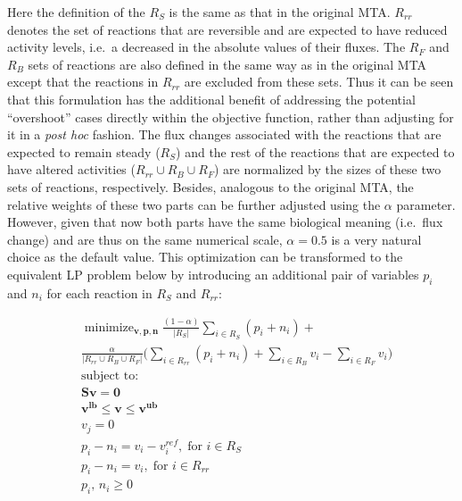 \documentclass[12pt,twoside,openany,\mydriver]{thesis}  %
\DeclareMathOperator*{\minimize}{minimize}
\begin{document}
Here the definition of the \(R_S\) is the same as that in the original MTA. \(R_{rr}\) denotes the set of reactions that are reversible and are expected to have reduced activity levels, i.e.~a decreased in the absolute values of their fluxes. The \(R_F\) and \(R_B\) sets of reactions are also defined in the same way as in the original MTA except that the reactions in \(R_{rr}\) are excluded from these sets. Thus it can be seen that this formulation has the additional benefit of addressing the potential ``overshoot'' cases directly within the objective function, rather than adjusting for it in a \emph{post hoc} fashion. The flux changes associated with the reactions that are expected to remain steady (\(R_S\)) and the rest of the reactions that are expected to have altered activities (\(R_{rr} \cup R_B \cup R_F\)) are normalized by the sizes of these two sets of reactions, respectively. Besides, analogous to the original MTA, the relative weights of these two parts can be further adjusted using the \(\alpha\) parameter. However, given that now both parts have the same biological meaning (i.e.~flux change) and are thus on the same numerical scale, \(\alpha=0.5\) is a very natural choice as the default value. This optimization can be transformed to the equivalent LP problem below by introducing an additional pair of variables \(p_i\) and \(n_i\) for each reaction in \(R_S\) and \(R_{rr}\):

\[
\begin{aligned}
&\minimize_{\mathbf{v,p,n}} \frac{(1-\alpha)}{|R_S|} \sum_{i \in R_S}{(p_i+n_i)} + \\
&\frac{\alpha}{|R_{rr} \cup R_B \cup R_F|} \bigg( \sum_{i \in R_{rr}}{(p_i+n_i)} + \sum_{i \in R_B}{v_i} - \sum_{i \in R_F}{v_i} \bigg)\\
&\text{subject to:} \\
&\mathbf{Sv = 0} \\
&\mathbf{v^{lb} \le v \le v^{ub}} \\
&v_j=0 \\
&p_i - n_i = v_i - v^{ref}_i,\; \text{for } i \in R_S \\
&p_i - n_i = v_i,\; \text{for } i \in R_{rr} \\
&p_i,\, n_i \ge 0 \\
\end{aligned}
\]
\end{document}
